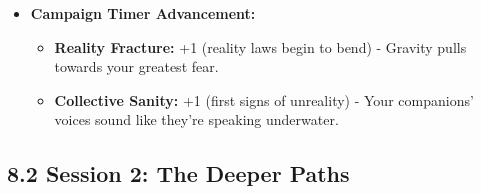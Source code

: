 \documentclass[11pt]{article}
\begin{document}
\begin{itemize}
\begin{itemize}
\item The Road's Own Child absorbs a memory: +1 segment (prevent with 1 Boon) - You forget the face of someone you loved, replaced by the memory of a stranger.
\end{itemize}
\item \textbf{Campaign Timer Advancement:}
\begin{itemize}
\item \textbf{Reality Fracture:} +1 (reality laws begin to bend) - Gravity pulls towards your greatest fear.
\item \textbf{Collective Sanity:} +1 (first signs of unreality) - Your companions' voices sound like they're speaking underwater.
\end{itemize}
\end{itemize}

\clearpage

\subsection*{8.2 Session 2: The Deeper Paths}
\end{document}
